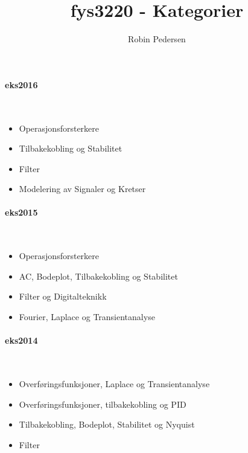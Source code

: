 \documentclass{article}
\begin{document}
  \title{fys3220 - Kategorier}
  \author{Robin Pedersen}
  \maketitle

  \paragraph{eks2016} \hfill \\
    \begin{itemize}
      \item Operasjonsforsterkere
      \item Tilbakekobling og Stabilitet
      \item Filter
      \item Modelering av Signaler og Kretser
    \end{itemize}

  \paragraph{eks2015} \hfill \\
    \begin{itemize}
      \item Operasjonsforsterkere
      \item AC, Bodeplot, Tilbakekobling og Stabilitet
      \item Filter og Digitalteknikk
      \item Fourier, Laplace og Transientanalyse
    \end{itemize}

  \paragraph{eks2014} \hfill \\
    \begin{itemize}
      \item Overføringsfunksjoner, Laplace og Transientanalyse
      \item Overføringsfunksjoner, tilbakekobling og PID
      \item Tilbakekobling, Bodeplot, Stabilitet og Nyquist
      \item Filter
    \end{itemize}
\end{document}
